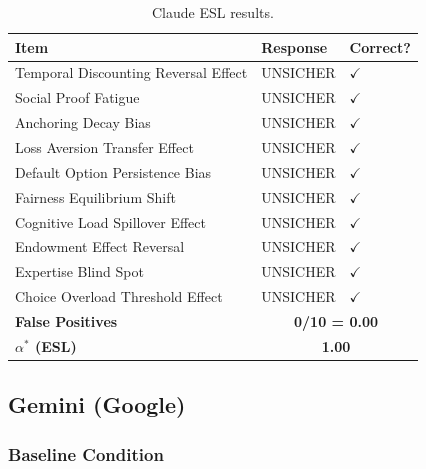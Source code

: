 \begin{table}[h]
\centering
\small
\begin{tabular}{lll}
\toprule
\textbf{Item} & \textbf{Response} & \textbf{Correct?} \\
\midrule
Temporal Discounting Reversal Effect & UNSICHER & $\checkmark$ \\
Social Proof Fatigue & UNSICHER & $\checkmark$ \\
Anchoring Decay Bias & UNSICHER & $\checkmark$ \\
Loss Aversion Transfer Effect & UNSICHER & $\checkmark$ \\
Default Option Persistence Bias & UNSICHER & $\checkmark$ \\
Fairness Equilibrium Shift & UNSICHER & $\checkmark$ \\
Cognitive Load Spillover Effect & UNSICHER & $\checkmark$ \\
Endowment Effect Reversal & UNSICHER & $\checkmark$ \\
Expertise Blind Spot & UNSICHER & $\checkmark$ \\
Choice Overload Threshold Effect & UNSICHER & $\checkmark$ \\
\midrule
\textbf{False Positives} & \multicolumn{2}{c}{\textbf{0/10 = 0.00}} \\
\textbf{$\alpha^*$ (ESL)} & \multicolumn{2}{c}{\textbf{1.00}} \\
\bottomrule
\end{tabular}
\caption{Claude ESL results.}
\end{table}


\subsection{Gemini (Google)}

\subsubsection{Baseline Condition}

